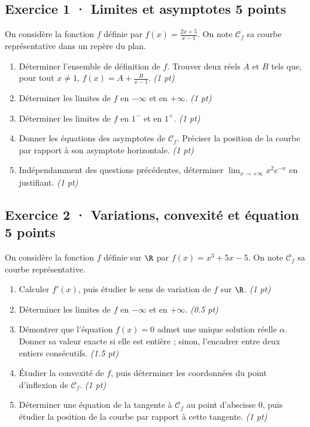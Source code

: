 \subsection*{Exercice 1 · Limites et asymptotes \hfill 5 points}On considère la fonction $f$ définie par $f(x)=\frac{2x+5}{x-1}$. On note $\mathcal C_f$ sa courbe représentative dans un repère du plan.

\begin{enumerate}

\item Déterminer l'ensemble de définition de $f$. Trouver deux réels $A$ et $B$ tels que, pour tout $x\ne1$, $f(x)=A+\frac B{x-1}$. \hfill\textit{(1 pt)}

\item Déterminer les limites de $f$ en $-\infty$ et en $+\infty$. \hfill\textit{(1 pt)}

\item Déterminer les limites de $f$ en $1^-$ et en $1^+$. \hfill\textit{(1 pt)}

\item Donner les équations des asymptotes de $\mathcal C_f$. Préciser la position de la courbe par rapport à son asymptote horizontale. \hfill\textit{(1 pt)}

\item Indépendamment des questions précédentes, déterminer $\displaystyle\lim_{x\to+\infty}x^{2}e^{-x}$ en justifiant. \hfill\textit{(1 pt)}

\end{enumerate}

\subsection*{Exercice 2 · Variations, convexité et équation \hfill 5 points}On considère la fonction $f$ définie sur $\R$ par $f(x)=x^3+5x-5$. On note $\mathcal C_f$ sa courbe représentative.

\begin{enumerate}

\item Calculer $f' (x)$, puis étudier le sens de variation de $f$ sur $\R$. \hfill\textit{(1 pt)}

\item Déterminer les limites de $f$ en $-\infty$ et en $+\infty$. \hfill\textit{(\num{0,5} pt)}

\item Démontrer que l'équation $f(x)=0$ admet une unique solution réelle $\alpha$. Donner sa valeur exacte si elle est entière ; sinon, l'encadrer entre deux entiers consécutifs. \hfill\textit{(\num{1,5} pt)}

\item Étudier la convexité de $f$, puis déterminer les coordonnées du point d'inflexion de $\mathcal C_f$. \hfill\textit{(1 pt)}

\item Déterminer une équation de la tangente à $\mathcal C_f$ au point d'abscisse $0$, puis étudier la position de la courbe par rapport à cette tangente. \hfill\textit{(1 pt)}

\end{enumerate}

